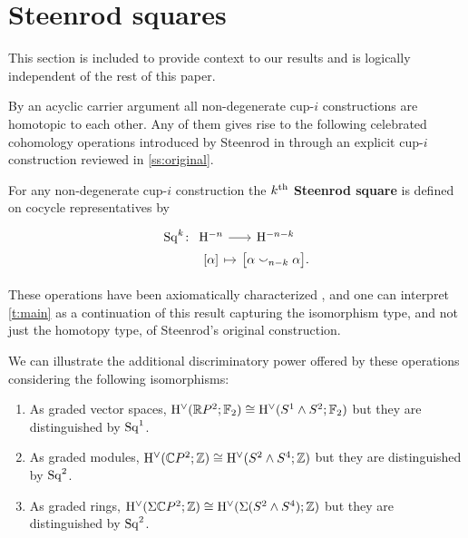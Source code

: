 
\section{Steenrod squares} \label{s:squares}

This section is included to provide context to our results and is logically independent of the rest of this paper.

By an acyclic carrier argument \cite{eilenberg1953acyclic} all non-degenerate \mbox{cup-$i$} constructions are homotopic to each other.
Any of them gives rise to the following celebrated cohomology operations introduced by Steenrod in \cite{steenrod1947products} through an explicit \mbox{cup-$i$} construction reviewed in \cref{ss:original}.

\begin{definition*}
	For any non-degenerate \mbox{cup-$i$} construction the \textbf{$k^{\mathrm{th}}$ Steenrod square} is defined on cocycle representatives by
	\[
	\begin{tikzcd} [column sep=tiny, row sep=0]
	\Sq^k \colon &[-10pt] \rH^{-n} \arrow[r] & \rH^{-n-k} \\
	& {[\alpha]} \arrow[r, mapsto] & \big[ \alpha \cup_{n-k} \alpha \big].
	\end{tikzcd}
	\]
\end{definition*}

These operations have been axiomatically characterized \cite{steenrod1962cohomology}, and one can interpret \cref{t:main} as a continuation of this result capturing the isomorphism type, and not just the homotopy type, of Steenrod's original construction.

\begin{remark*}
	We can illustrate the additional discriminatory power offered by these operations considering the following isomorphisms:
	\begin{enumerate}
		\item As graded vector spaces, $\mathrm{H}^\vee(\mathbb{R} P^2; {\mathbb{F}_2}) \cong \mathrm{H}^\vee(S^1 \wedge S^2; {\mathbb{F}_2})$
		but they are distinguished by $\mathrm{Sq}^1$.
		\item As graded modules, $\mathrm{H}^\vee(\mathbb C P^2; \mathbb{Z}) \cong \mathrm{H}^\vee(S^2 \wedge S^4; \mathbb{Z})$
		but they are distinguished by $\mathrm{Sq}^2$.
		\item As graded rings, $\mathrm{H}^\vee(\Sigma \mathbb C P^2; \mathbb{Z}) \cong \mathrm{H}^\vee(\Sigma (S^2 \wedge S^4); \mathbb{Z})$
		but they are distinguished by $\mathrm{Sq}^2$.
	\end{enumerate}
\end{remark*}

